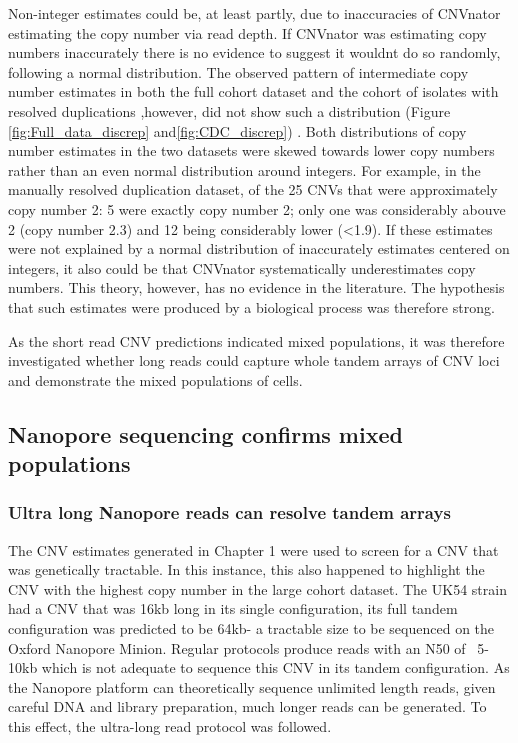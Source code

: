 \documentclass{article}
\begin{document}
Non-integer estimates could be, at least partly, due to inaccuracies of CNVnator estimating the copy number via read depth. If CNVnator was estimating copy numbers inaccurately there is no evidence to suggest it wouldnt do so randomly, following a normal distribution. The observed pattern of intermediate copy number estimates in both the full cohort dataset and the cohort of isolates with resolved duplications ,however, did not show such a distribution (Figure \ref{fig:Full_data_discrep} and\ref{fig:CDC_discrep}) . Both distributions of copy number estimates in the two datasets were skewed towards lower copy numbers rather than an even normal distribution around integers. For example, in the manually resolved duplication dataset, of the 25 CNVs that were approximately copy number 2: 5 were exactly copy number 2; only one was considerably abouve 2 (copy number 2.3) and 12 being considerably lower (<1.9). If these estimates were not explained by a normal distribution of inaccurately estimates centered on integers, it also could be that CNVnator systematically underestimates copy numbers. This theory, however, has no evidence in the literature. The hypothesis that such estimates were produced by a biological process was therefore strong.

As the short read CNV predictions indicated mixed populations, it was therefore investigated whether long reads could capture whole tandem arrays of CNV loci and demonstrate the mixed populations of cells.


\subsection{Nanopore sequencing confirms mixed populations}

\subsubsection{Ultra long Nanopore reads can resolve tandem arrays}

The CNV estimates generated in Chapter 1 were used to screen for a CNV that was genetically tractable. In this instance, this also happened to highlight the CNV with the highest copy number in the large cohort dataset. The UK54 strain had a CNV that was 16kb long in its single configuration, its full tandem configuration was predicted to be 64kb- a tractable size to be sequenced on the Oxford Nanopore Minion. Regular protocols produce reads with an N50 of ~5-10kb which is not adequate to sequence this CNV in its tandem configuration. As the Nanopore platform can theoretically sequence unlimited length reads, given careful DNA and library preparation, much longer reads can be generated. To this effect, the ultra-long read protocol was followed.
\end{document}

